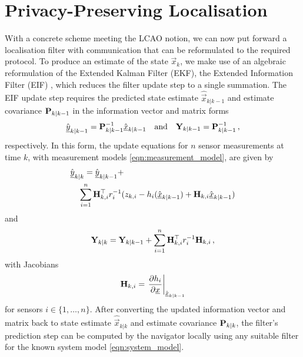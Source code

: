 \documentclass[10pt,letterpaper,oneside,twocolumn,journal]{IEEEtran}
\theoremstyle{definition}
\theoremstyle{definition}
\theoremstyle{remark}
\begin{document}
\section{Privacy-Preserving Localisation} \label{sec:priv_localisation}
With a concrete scheme meeting the LCAO notion, we can now put forward a localisation filter with communication that can be reformulated to the required protocol. To produce an estimate of the state $\vec{x}_k$, we make use of an algebraic reformulation of the Extended Kalman Filter (EKF), the Extended Information Filter (EIF) \cite{maybeckStochasticModelsEstimation1982}, which reduces the filter update step to a single summation. The EIF update step requires the predicted state estimate $\hat{\vec{x}}_{k|k-1}$ and estimate covariance ${{\mathbf{P}}}_{k|k-1}$ in the information vector and matrix forms
\begin{equation}
    \hat{{\underline{y}}}_{k|k-1} = {{\mathbf{P}}}_{k|k-1}^{-1}\hat{{\underline{x}}}_{k|k-1} \quad\textrm{and}\quad {\ensuremath{{\mathbf{Y}}}}_{k|k-1} = {{\mathbf{P}}}_{k|k-1}^{-1}\,,
\end{equation}
respectively. In this form, the update equations for $n$ sensor measurements at time $k$, with measurement models \eqref{eqn:measurement_model}, are given by
\begin{equation}
    \begin{split}
        &\hat{\vec{y}}_{k|k} = \hat{\vec{y}}_{k|k-1} + \\
        &\quad \sum^n_{i=1}\mat{H}^\top_{k,i} r^{-1}_i (z_{k,i} - h_i(\hat{\vec{x}}_{k|k-1}) + \mat{H}_{k,i}\hat{\vec{x}}_{k|k-1})
    \end{split} \label{eqn:eif_info_vec_update}
\end{equation}
and
\begin{equation}
    \mat{Y}_{k|k} = \mat{Y}_{k|k-1} + \sum^n_{i=1}\mat{H}^\top_{k,i} r^{-1}_i \mat{H}_{k,i}\,, \label{eqn:eif_info_mat_update}
\end{equation}
with Jacobians
\begin{equation}
    \mat{H}_{k,i} = \left.\frac{\partial h_i}{\partial \vec{x}}\right|_{\hat{\vec{x}}_{k|k-1}} \label{eqn:measurement_jacobian}
\end{equation}
for sensors $i\in\{1,\dots,n\}$. After converting the updated information vector and matrix back to state estimate $\hat{\vec{x}}_{k|k}$ and estimate covariance ${{\mathbf{P}}}_{k|k}$, the filter's prediction step can be computed by the navigator locally using any suitable filter for the known system model \eqref{eqn:system_model}.
\end{document}
